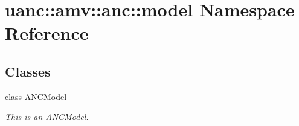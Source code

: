 \hypertarget{namespaceuanc_1_1amv_1_1anc_1_1model}{}\section{uanc\+:\+:amv\+:\+:anc\+:\+:model Namespace Reference}
\label{namespaceuanc_1_1amv_1_1anc_1_1model}
\subsection*{Classes}
\begin{DoxyCompactItemize}
\item 
class \hyperlink{classuanc_1_1amv_1_1anc_1_1model_1_1_a_n_c_model}{A\+N\+C\+Model}
\begin{DoxyCompactList}\small\item\em This is an \hyperlink{classuanc_1_1amv_1_1anc_1_1model_1_1_a_n_c_model}{A\+N\+C\+Model}. \end{DoxyCompactList}\end{DoxyCompactItemize}
